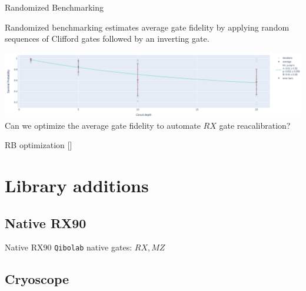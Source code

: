 \documentclass[aspectratio=169,10pt]{beamer}
\begin{document}
\begin{frame}[t,fragile]{Randomized Benchmarking}
\begin{center}
  Randomized benchmarking estimates average gate fidelity by applying random sequences of Clifford gates followed by an inverting gate.
  \vspace{1.25em}

  \includegraphics[width=\textwidth]{figures/rb.png}
  \vspace{1.25em}
  Can we optimize the average gate fidelity to automate $RX$ gate reacalibration? 
\end{center}
\end{frame}

\begin{frame}[t,fragile]{RB optimization [\cite{kelly_optimal_2014}]}%
\end{frame}


%  

\section{Library additions}

\subsection{Native RX90}

\begin{frame}{Native RX90}
  \centering
  \texttt{Qibolab} native gates: $ RX, MZ$
\end{frame}

\subsection{Cryoscope}
\end{document}
